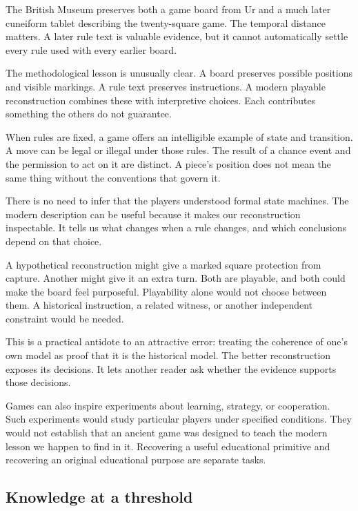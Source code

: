 \documentclass[11pt]{article}
\begin{document}
The British Museum preserves both a game board from Ur and a much later
cuneiform tablet describing the twenty-square game.\cite{urboard,urrules}
The temporal distance matters. A later rule text is valuable evidence,
but it cannot automatically settle every rule used with every earlier board.

The methodological lesson is unusually clear. A board preserves possible
positions and visible markings. A rule text preserves instructions. A modern
playable reconstruction combines these with interpretive choices. Each
contributes something the others do not guarantee.

When rules are fixed, a game offers an intelligible example of state and
transition. A move can be legal or illegal under those rules. The result of
a chance event and the permission to act on it are distinct. A piece's position
does not mean the same thing without the conventions that govern it.

There is no need to infer that the players understood formal state machines.
The modern description can be useful because it makes our reconstruction
inspectable. It tells us what changes when a rule changes, and which conclusions
depend on that choice.

A hypothetical reconstruction might give a marked square protection from
capture. Another might give it an extra turn. Both are playable, and both
could make the board feel purposeful. Playability alone would not choose
between them. A historical instruction, a related witness, or another
independent constraint would be needed.

This is a practical antidote to an attractive error: treating the coherence
of one's own model as proof that it is the historical model. The better
reconstruction exposes its decisions. It lets another reader ask whether
the evidence supports those decisions.

Games can also inspire experiments about learning, strategy, or cooperation.
Such experiments would study particular players under specified conditions.
They would not establish that an ancient game was designed to teach the
modern lesson we happen to find in it. Recovering a useful educational
primitive and recovering an original educational purpose are separate tasks.

\subsection{Knowledge at a threshold}
\end{document}
